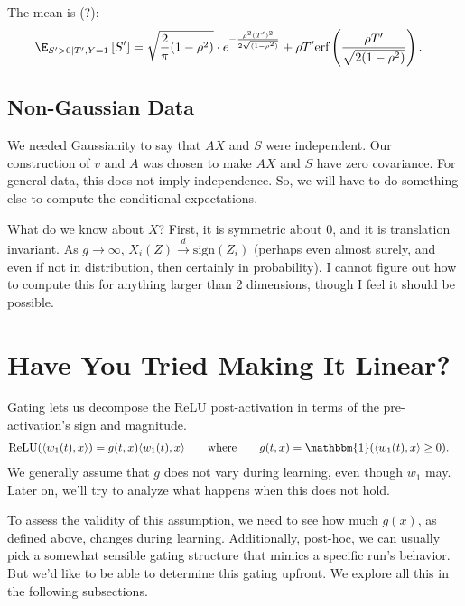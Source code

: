 \documentclass{article}
\begin{document}
The mean is (?):
\begin{align}
  \E_{S'>0 \mid T', Y=1} \left[ S' \right]
  &= \sqrt{\frac{2}{\pi} (1-\rho^2)} \cdot e^{ -\frac{\rho^2 (T')^2}{2 \sqrt{(1-\rho^2)}} } + \rho T' \text{erf} \left( \frac{\rho T'}{\sqrt{2(1 - \rho^2)}} \right).
\end{align}


\subsection*{Non-Gaussian Data}
We needed Gaussianity to say that $A X$ and $S$ were independent.
Our construction of $v$ and $A$ was chosen to make $A X$ and $S$ have zero covariance.
For general data, this does not imply independence.
So, we will have to do something else to compute the conditional expectations.

What do we know about $X$?
First, it is symmetric about 0, and it is translation invariant.
As $g \to \infty$, $X_i(Z) \overset{d}{\to} \text{sign}(Z_i)$ (perhaps even almost surely, and even if not in distribution, then certainly in probability).
I cannot figure out how to compute this for anything larger than 2 dimensions, though I feel it should be possible.




\section{Have You Tried Making It Linear?}

Gating lets us decompose the ReLU post-activation in terms of the pre-activation's sign and magnitude.
\begin{align}
  \text{ReLU}(\langle w_1(t), x \rangle)
  &= g(t, x) \langle w_1(t), x \rangle \qquad \text{where} \qquad g(t, x) = \mathbbm{1}( \langle w_1(t), x \rangle \geq 0 ). \label{eq:relu_gating}
\end{align}
We generally assume that $g$ does not vary during learning, even though $w_1$ may.
Later on, we'll try to analyze what happens when this does not hold.

To assess the validity of this assumption, we need to see how much $g(x)$, as defined above, changes during learning.
Additionally, post-hoc, we can usually pick a somewhat sensible gating structure that mimics a specific run's behavior.
But we'd like to be able to determine this gating upfront.
We explore all this in the following subsections.
\end{document}
